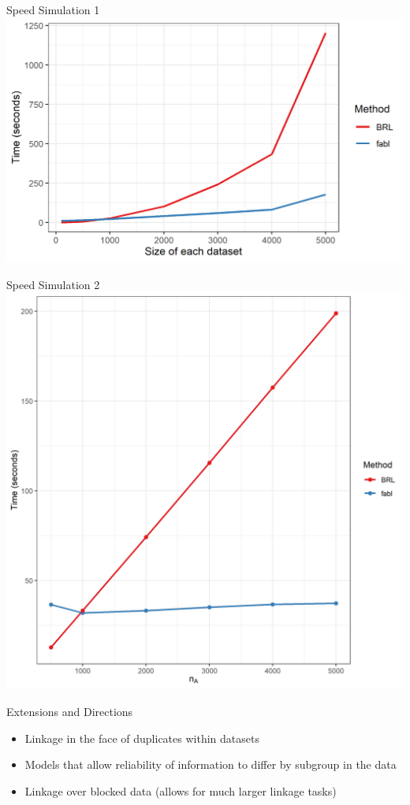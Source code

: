 \documentclass{beamer}
\begin{document}
	\begin{frame}{Speed Simulation 1}
	\includegraphics[width = \textwidth, height = .7\textwidth ]{../notes/figures/sadinle_speed_plot2.png}
\end{frame}

	\begin{frame}{Speed Simulation 2}
	\includegraphics[width = \textwidth, height = .7\textwidth ]{../notes/figures/speed_plot_fixed_nB.png}
\end{frame}

\begin{frame}{Extensions and Directions}
	\begin{itemize}
	\item Linkage in the face of duplicates within datasets
	
	\item Models that allow reliability of information to differ by subgroup in the data
	
	\item Linkage over blocked data (allows for much larger linkage tasks)
	\end{itemize}
\end{frame}
\end{document}
